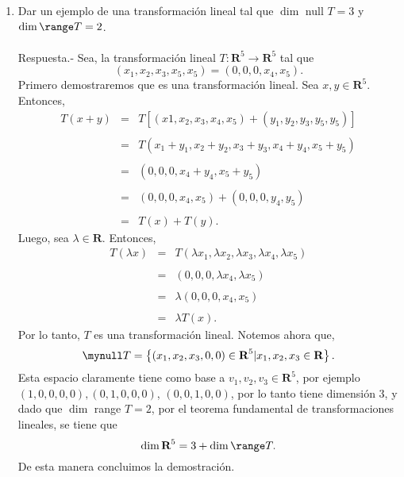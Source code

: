 
\setcounter{mysection}{1}

\begin{enumerate}[\bfseries 1.]

    \item Dar un ejemplo de una transformación lineal tal que $\dim$ null $T=3$ y $\dim \range T=2$.\\\\
	Respuesta.-\; Sea, la transformación lineal $T:\textbf{R}^5 \to \textbf{R}^5$ tal que 
	$$(x_1,x_2,x_3,x_5,x_5)=(0,0,0,x_4,x_5).$$
	Primero demostraremos que es una transformación lineal. Sea $x,y\in \textbf{R}^5$. Entonces,
	$$
	\begin{array}{rcl}
	    T(x+y) &=& T\left[(x1,x_2,x_3,x_4,x_5)+(y_1,y_2,y_3,y_5,y_5)\right]\\\\
		   &=& T(x_1+y_1,x_2+y_2,x_3+y_3,x_4+y_4,x_5+y_5)\\\\
		   &=& (0,0,0,x_4+y_4,x_5+y_5)\\\\
		   &=& (0,0,0,x_4,x_5)+(0,0,0,y_4,y_5)\\\\
		   &=& T(x)+T(y).
	\end{array}
	$$
	Luego, sea $\lambda \in \textbf{R}$. Entonces,
	$$
	\begin{array}{rcl}
	    T(\lambda x) &=& T(\lambda x_1,\lambda x_2,\lambda x_3,\lambda x_4,\lambda x_5)\\\\
			 &=& (0,0,0,\lambda x_4,\lambda x_5)\\\\
			 &=& \lambda(0,0,0,x_4,x_5)\\\\
			 &=& \lambda T(x).
	\end{array}
	$$
	Por lo tanto, $T$ es una transformación lineal.  Notemos ahora que,
	$$\mynull T=\left\{(x_1,x_2,x_3,0,0)\in \textbf{R}^5 | x_1,x_2,x_3\in \textbf{R}\right\}.$$
	Esta espacio claramente tiene como base a $v_1,v_2,v_3\in \textbf{R}^5$, por ejemplo $(1,0,0,0,0),(0,1,0,0,0)$, $(0,0,1,0,0)$, por lo tanto tiene dimensión $3$, y dado que $\dim$ range $T=2$, por el teorema fundamental de transformaciones lineales, se tiene que
	$$\dim \textbf{R}^5=3+\dim \range T.$$
	De esta manera concluimos la demostración.\\\\


\end{enumerate}

